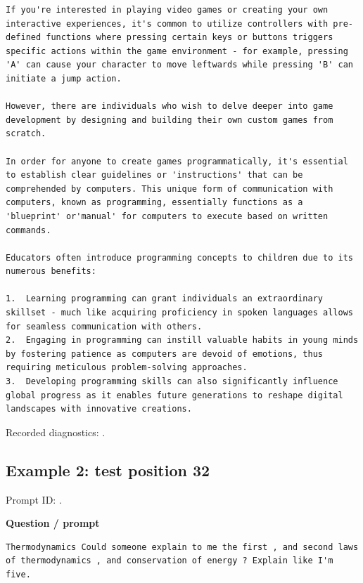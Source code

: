 \begin{Verbatim}
If you're interested in playing video games or creating your own interactive experiences, it's common to utilize controllers with pre-defined functions where pressing certain keys or buttons triggers specific actions within the game environment - for example, pressing 'A' can cause your character to move leftwards while pressing 'B' can initiate a jump action.

However, there are individuals who wish to delve deeper into game development by designing and building their own custom games from scratch. 

In order for anyone to create games programmatically, it's essential to establish clear guidelines or 'instructions' that can be comprehended by computers. This unique form of communication with computers, known as programming, essentially functions as a 'blueprint' or'manual' for computers to execute based on written commands.

Educators often introduce programming concepts to children due to its numerous benefits:

1.  Learning programming can grant individuals an extraordinary skillset - much like acquiring proficiency in spoken languages allows for seamless communication with others.
2.  Engaging in programming can instill valuable habits in young minds by fostering patience as computers are devoid of emotions, thus requiring meticulous problem-solving approaches.
3.  Developing programming skills can also significantly influence global progress as it enables future generations to reshape digital landscapes with innovative creations.
\end{Verbatim}

Recorded diagnostics:
\texttt{}.

\subsection{Example 2: test position
32}\label{record-docs-watermarking-qualitative-text-textseal2-bira-md-example-2-test-position-32}

Prompt ID:
\texttt{}.

\textbf{Question / prompt}

\begin{Verbatim}
Thermodynamics Could someone explain to me the first , and second laws of thermodynamics , and conservation of energy ? Explain like I'm five.
\end{Verbatim}

